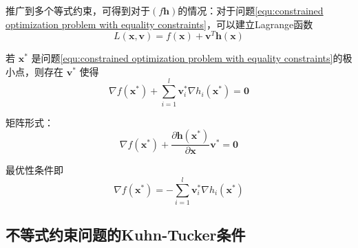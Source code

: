 \documentclass{book}
\begin{document}
推广到多个等式约束，可得到对于$(f\boldsymbol{h})$的情况：对于问题\ref{equ:constrained optimization problem with equality constraints}，可以建立Lagrange函数
\begin{equation}
    L(\boldsymbol{x},\boldsymbol{v})=f(\boldsymbol{x})+\boldsymbol{v}^T\boldsymbol{h}(\boldsymbol{x})
    \label{equ:Lagrange function}
\end{equation}

若 $\boldsymbol{x}^*$ 是问题\ref{equ:constrained optimization problem with equality constraints}的极小点，则存在 $\boldsymbol{v}^*$ 使得
\begin{equation}
    \nabla f(\boldsymbol{x}^*)+\sum_{i=1}^{l}\boldsymbol{v}_i^*\nabla h_i(\boldsymbol{x}^*)=\boldsymbol{0}
\end{equation}

矩阵形式：
\begin{equation}
    \nabla f(\boldsymbol{x}^*)+\frac{\partial\boldsymbol{h}(\boldsymbol{x}^*)}{\partial\boldsymbol{x}}\boldsymbol{v}^*=\boldsymbol{0}
\end{equation}

最优性条件即%
\begin{equation}
    \nabla f(\boldsymbol{x}^*) = -\sum_{i=1}^{l}\boldsymbol{v}_i^*\nabla h_i(\boldsymbol{x}^*)
\end{equation}



\subsection{不等式约束问题的Kuhn-Tucker条件}
\end{document}
